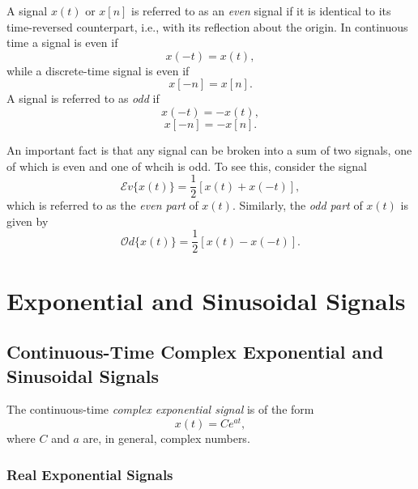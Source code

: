 \documentclass[a4paper,twoside]{book}
\begin{document}
A signal $x(t)$ or $x[n]$ is referred to as an \textit{even} signal if it is identical to its time-reversed counterpart, i.e., with its reflection about the origin. In continuous time a signal is even if
\begin{equation}
    x(-t)=x(t),
    \label{1.14}
\end{equation}
while a discrete-time signal is even if
\begin{equation}
    x[-n]=x[n].
    \label{1.15}
\end{equation}
A signal is referred to as \textit{odd} if
\begin{equation}
    x(-t)=-x(t),
    \label{1.16}
\end{equation}
\begin{equation}
    x[-n]=-x[n].
    \label{1.17}
\end{equation}

An important fact is that any signal can be broken into a sum of two signals, one of which is even and one of whcih is odd. To see this, consider the signal
\begin{equation}
    \mathcal{E}v\{x(t)\}=\dfrac{1}{2}[x(t)+x(-t)],
    \label{1.18}
\end{equation}
which is referred to as the \textit{even part} of $x(t)$. Similarly, the \textit{odd part} of $x(t)$ is given by
\begin{equation}
    \mathcal{O}d\{x(t)\}=\dfrac{1}{2}[x(t)-x(-t)].
    \label{1.19}
\end{equation}

\section{Exponential and Sinusoidal Signals}
\subsection{Continuous-Time Complex Exponential and Sinusoidal Signals}

The continuous-time \textit{complex exponential signal} is of the form
\begin{equation}
    x(t)=Ce^{at},
    \label{1.20}
\end{equation}
where $C$ and $a$ are, in general, complex numbers.

\subsubsection{Real Exponential Signals}
\end{document}
